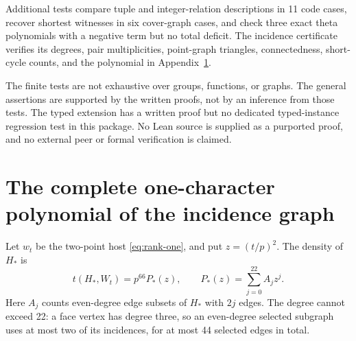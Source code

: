 \documentclass[11pt]{article}
\numberwithin{equation}{section}
\theoremstyle{definition}
\theoremstyle{remark}
\newcommand{\Hstar}{H_{\!*}}
\begin{document}
Additional tests compare tuple and integer-relation descriptions in 11
code cases, recover shortest witnesses in six cover-graph cases, and
check three exact theta polynomials with a negative term but no total
deficit. The incidence certificate verifies its degrees, pair
multiplicities, point-graph triangles, connectedness, short-cycle counts,
and the polynomial in Appendix~\ref{app:polynomial}.

The finite tests are not exhaustive over groups, functions, or graphs.
The general assertions are supported by the written proofs, not by an
inference from those tests. The typed extension has a written proof but
no dedicated typed-instance regression test in this package. No Lean
source is supplied as a purported proof, and no external peer or formal
verification is claimed.

\appendix
\section{The complete one-character polynomial of the incidence graph}
\label{app:polynomial}

Let $w_t$ be the two-point host \eqref{eq:rank-one}, and put $z=(t/p)^2$.
The density of $\Hstar$ is
\begin{equation}
 t(\Hstar,W_t)=p^{66}P_*(z),\qquad
 P_*(z)=\sum_{j=0}^{22}A_jz^j.
 \label{eq:Pstar}
\end{equation}
Here $A_j$ counts even-degree edge subsets of $\Hstar$ with $2j$ edges.
The degree cannot exceed 22: a face vertex has degree three, so an
even-degree selected subgraph uses at most two of its incidences,
for at most 44 selected edges in total.
\end{document}
